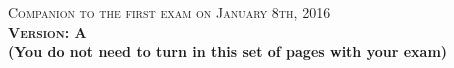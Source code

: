 \documentclass{docist}
\begin{document}
\thispagestyle{empty}

\begin{center}
  {\Large \textsc{Companion to the first exam on January 8th, 2016\\[2ex]
  \textbf{Version: A}\\[2ex]}}
  {\normalsize  \textbf{(You do not need to turn in this set of pages with your exam)}}
\end{center}




\qArchitectureInfluenceCycleOne


\qAdventureBuilderOne


\qRequirementsOne


\qArchitectureDefinitionOne


\qScenariosTacticsOne


\qModuleComponentOne


\qAvailabilityOne


\qModifiabilityOneOne


\qPerformanceOneOne


\qNginxScenariosTacticsOne


\qContinousIntegrationScenariosTacticsOne


\qInfinispanScenariosTacticsOne


\qDesigningArchitectureOne


\qModuleViewtypeOneOne


\qUsesGeneralizationOne

\end{document}
